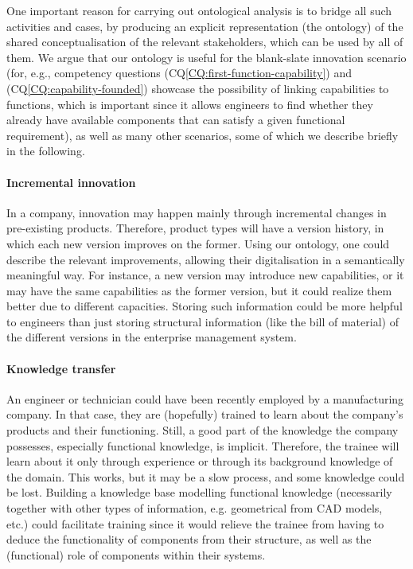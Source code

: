 \documentclass[sw]{iosart2x}
\newcommand{\CQLabel}{\textrm{CQ}}
\newcommand{\refCQ}[1]{({\CQLabel}\ref{#1})}
\newcommand{\TODO}[1]{{%
}}
\begin{document}
One important reason for carrying out ontological analysis is to bridge all such activities and cases, by producing an explicit representation (the ontology) of the shared conceptualisation of the relevant stakeholders, which can be used by all of them.
We argue that our ontology is useful for the blank-slate innovation scenario (for, e.g., competency questions \refCQ{CQ:first-function-capability} and \refCQ{CQ:capability-founded} showcase the possibility of linking capabilities to functions, which is important since it allows engineers to find whether they already have available components that can satisfy a given functional requirement), as well as many other scenarios, some of which we describe briefly in the following. 

\paragraph{Incremental innovation} In a company, innovation may happen mainly through incremental changes in pre-existing products. 
Therefore, product types will have a version history, in which each new version improves on the former. 
Using our ontology, one could describe %
the relevant improvements, allowing their digitalisation in a semantically meaningful way. 
For instance, a new version may introduce new capabilities, or it may have the same capabilities as the former version, but it could realize them better due to different capacities. 
Storing such information could be more helpful to engineers than just storing structural information (like the bill of material) of the different versions in the enterprise management system.

\paragraph{Knowledge transfer} An engineer or technician could have been recently employed by a manufacturing company. 
In that case, they are (hopefully) trained to learn about the company's products and their functioning. 
Still, a good part of the knowledge the company possesses, especially functional knowledge, is implicit. 
Therefore, the trainee will learn about it only through experience or through its background knowledge of the domain. 
This works, but it may be a slow process, and some knowledge could be lost. 
Building a knowledge base modelling functional knowledge (necessarily together with other types of information, e.g. geometrical from CAD models, etc.) could facilitate training since it would relieve the trainee from having to deduce the functionality of components from their structure, as well as the (functional) role of components within their systems. 
\end{document}
